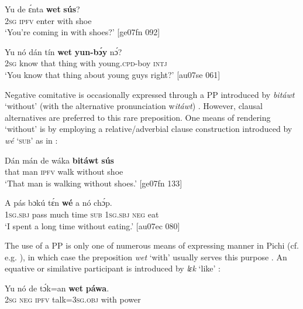 \ea%
    \label{ex:key:1071}
    \gll Yu  de  ɛ́nta    \textbf{wet}    \textbf{sús}?\\
\textsc{2sg}  \textsc{ipfv}  enter  with    shoe\\

\glt ‘You’re coming in with shoes?’ [ge07fn 092]
\z


\ea%
    \label{ex:key:1072}
    \gll Yu  nó    dán  tín    \textbf{wet}    \textbf{yun-bɔ́y}      nɔ́?\\
\textsc{2sg}  know  that  thing  with    young\textsc{.cpd}{}-boy  \textsc{intj}\\

\glt ‘You know that thing about young guys right?’ [au07se 061]
\z

Negative comitative is occasionally expressed through a PP introduced by \textit{bitáwt} ‘without’ (with the alternative pronunciation w\textit{itáwt}) . However, clausal alternatives are preferred to this rare preposition. One means of rendering ‘without’ is by employing a relative/adverbial clause construction introduced by \textit{wé} ‘\textsc{sub}’ as in : 


\ea%
    \label{ex:key:1073}
    \gll Dán  mán    de  wáka  \textbf{bitáwt}  \textbf{sús}\\
that  man    \textsc{ipfv}  walk  without  shoe\\

\glt ‘That man is walking without shoes.’ [ge07fn 133]
\z


\ea%
    \label{ex:key:1074}
    \gll A    pás    bɔkú  tɛ́n    \textbf{wé}  a    nó  chɔ́p.\\
\textsc{1sg.sbj}  pass    much  time    \textsc{sub}  \textsc{1sg.sbj}  \textsc{neg}  eat\\

\glt ‘I spent a long time without eating.’ [au07ec 080]
\z

The use of a PP is only one of numerous means of expressing manner in Pichi \is{}(cf. e.g. ), in which case the preposition \textit{wet} ‘with’ usually serves this purpose . An equative or similative participant is introduced by \textit{lɛk} ‘like’ :


\ea%
    \label{ex:key:1075}
    \gll Yu  nó  de  tɔ́k=an    \textbf{wet}    \textbf{páwa}.\\
\textsc{2sg}  \textsc{neg}  \textsc{ipfv}  talk=\textsc{3sg.obj}  with    power\\

